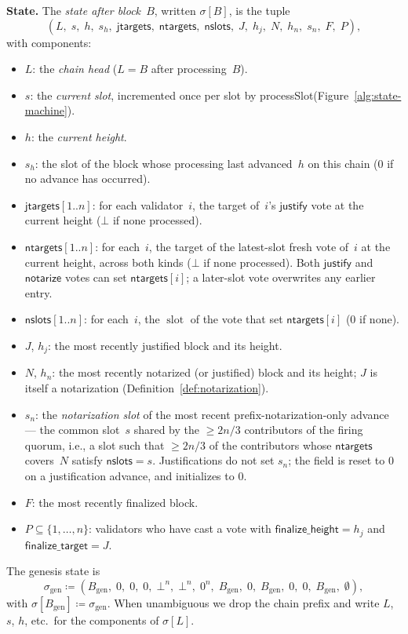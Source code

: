 \documentclass{article}
\newcommand{\genesis}{\ensuremath{B_{\mathrm{gen}}}}
\newcommand{\slot}[0]{\ensuremath{\operatorname{\mathrm{slot}}}}
\newcommand{\just}{\ensuremath{\mathsf{justify}}\xspace}
\newcommand{\notar}{\ensuremath{\mathsf{notarize}}\xspace}
\newcommand{\finalizeHeight}{\mathsf{finalize\_height}}
\newcommand{\finalizeTarget}{\mathsf{finalize\_target}}
\newcommand{\jtargets}{\mathsf{jtargets}}
\newcommand{\ntargets}{\mathsf{ntargets}}
\newcommand{\nslots}{\mathsf{nslots}}
\newcommand{\processSlot}{\textsf{processSlot}\xspace}
\renewcommand{\paragraph}[1]{\vspace{7pt}\noindent\textbf{#1}}
\theoremstyle{plain}
\theoremstyle{definition}
\theoremstyle{remark}
\begin{document}
\paragraph{State.}
The \emph{state after block~$B$}, written $\sigma[B]$, is the tuple
\[
  (L,\; s,\; h,\; s_h,\; \jtargets,\; \ntargets,\; \nslots,\; J,\; h_j,\; N,\; h_n,\; s_n,\; F,\; P),
\]
with components:
\begin{itemize}
  \item $L$: the \emph{chain head} ($L = B$ after processing~$B$).
  \item $s$: the \emph{current slot}, incremented once per slot by \processSlot (Figure~\ref{alg:state-machine}).
  \item $h$: the \emph{current height}.
  \item $s_h$: the slot of the block whose processing last advanced~$h$ on this chain ($0$ if no advance has occurred).
  \item $\jtargets[1..n]$: for each validator~$i$, the target of~$i$'s \just vote at the current height ($\bot$ if none processed).
  \item $\ntargets[1..n]$: for each~$i$, the target of the latest-slot fresh vote of~$i$ at the current height, across both kinds ($\bot$ if none processed). Both \just and \notar votes can set $\ntargets[i]$; a later-slot vote overwrites any earlier entry.
  \item $\nslots[1..n]$: for each~$i$, the $\slot$ of the vote that set $\ntargets[i]$ ($0$ if none).
  \item $J$, $h_j$: the most recently justified block and its height.
  \item $N$, $h_n$: the most recently notarized (or justified) block and its height; $J$ is itself a notarization (Definition~\ref{def:notarization}).
  \item $s_n$: the \emph{notarization slot} of the most recent prefix-notarization-only advance --- the common slot~$s$ shared by the $\geq 2n/3$ contributors of the firing quorum, i.e., a slot such that $\geq 2n/3$ of the contributors whose $\ntargets$ covers~$N$ satisfy $\nslots = s$. Justifications do not set $s_n$; the field is reset to $0$ on a justification advance, and initializes to $0$.
  \item $F$: the most recently finalized block.
  \item $P \subseteq \{1, \ldots, n\}$: validators who have cast a vote with $\finalizeHeight = h_j$ and $\finalizeTarget = J$.
\end{itemize}
The genesis state is
\[
  \sigma_{\mathrm{gen}} \coloneqq (\genesis,\; 0,\; 0,\; 0,\; \bot^n,\; \bot^n,\; 0^n,\; \genesis,\; 0,\; \genesis,\; 0,\; 0,\; \genesis,\; \emptyset),
\]
with $\sigma[\genesis] \coloneqq \sigma_{\mathrm{gen}}$.
When unambiguous we drop the chain prefix and write $L$, $s$, $h$, etc.\ for the components of $\sigma[L]$.
\end{document}
